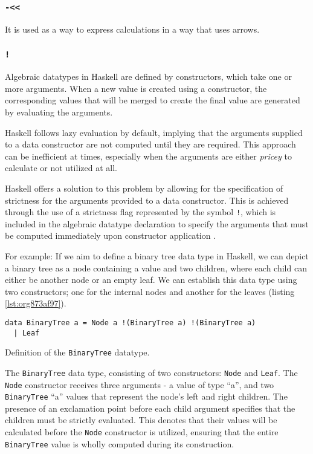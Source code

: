 \documentclass[a4paper, titlepage, twoside]{article}
\begin{document}
\subsubsection{\texttt{-<{}<{}}}
\label{sec:orgd2eaad2}

It is used as a way to express calculations in a way that uses arrows.

\subsubsection{\texttt{!}}
\label{sec:orgb7ae2f1}

Algebraic datatypes in Haskell are defined by constructors, which take one or more arguments. When a new value is created using a constructor, the corresponding values that will be merged to create the final value are generated by evaluating the arguments.

Haskell follows lazy evaluation by default, implying that the arguments supplied to a data constructor are not computed until they are required. This approach can be inefficient at times, especially when the arguments are either \emph{pricey} to calculate or not utilized at all.

Haskell offers a solution to this problem by allowing for the specification of strictness for the arguments provided to a data constructor. This is achieved through the use of a strictness flag represented by the symbol \texttt{!}, which is included in the algebraic datatype declaration to specify the arguments that must be computed immediately upon constructor application \autocite{marlowHaskell2010Language2010,haskellwikiHaskellHaskellWiki2023}.

For example: If we aim to define a binary tree data type in Haskell, we can depict a binary tree as a node containing a value and two children, where each child can either be another node or an empty leaf. We can establish this data type using two constructors; one for the internal nodes and another for the leaves (listing \ref{lst:org873af97}).

\begin{listing}[htbp]
\begin{verbatim}
data BinaryTree a = Node a !(BinaryTree a) !(BinaryTree a)
  | Leaf
\end{verbatim}
\caption{\label{lst:org873af97}Definition of the \texttt{BinaryTree} datatype.}
\end{listing}

The \texttt{BinaryTree} data type, consisting of two constructors: \texttt{Node} and \texttt{Leaf}. The \texttt{Node} constructor receives three arguments - a value of type ``a'', and two \texttt{BinaryTree} ``a'' values that represent the node's left and right children. The presence of an exclamation point before each child argument specifies that the children must be strictly evaluated. This denotes that their values will be calculated before the \texttt{Node} constructor is utilized, ensuring that the entire \texttt{BinaryTree} value is wholly computed during its construction.
\end{document}
